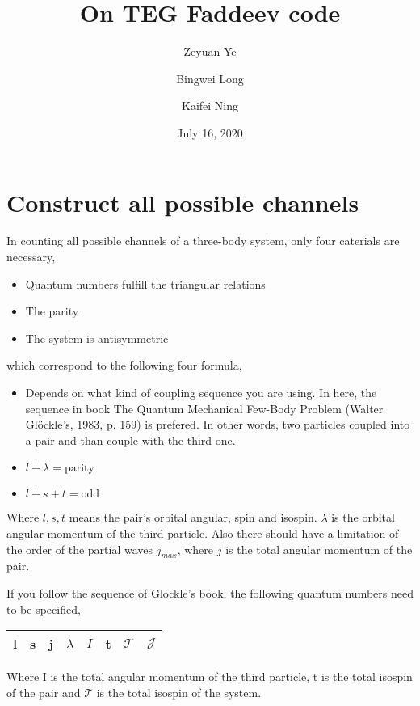 \documentclass[11pt,aps]{revtex4}
\begin{document}
\date{July 16, 2020}

\title{On TEG Faddeev code}

\author{Zeyuan Ye}
\author{Bingwei Long}
\author{Kaifei Ning}

\maketitle

\section{Construct all possible channels}
In counting all possible channels of a three-body system, only four caterials are necessary,

\begin{itemize}
\item{Quantum numbers fulfill the triangular relations}
\item{The parity}
\item{The system is antisymmetric}
\end{itemize}

which correspond to the following four formula,

\begin{itemize}
\item{Depends on what kind of coupling sequence you are using. In here, the
    sequence in book The Quantum Mechanical Few-Body Problem (Walter Glöckle's,
    1983, p. 159) is prefered. In other words, two
    particles coupled into a pair and than couple with the third one.}
\item{$l+\lambda = \text{parity}$}
\item{$l + s + t = \text{odd}$}
\end{itemize}

Where $l, s, t$ means the pair's orbital angular, spin and isospin. $\lambda$ is
the orbital angular momentum of the third particle.
Also there should have a limitation of the order of the partial waves $j_{max}$,
where $j$ is the total angular momentum of the pair.

If you follow the sequence of Glockle's book, the following quantum numbers need
to be specified,
\begin{center}
\begin{tabular}{ | c  c  c c c c c c|}
\hline
l & s & j & $\lambda$ & $I$ & t & $\mathcal{T}$ & $\mathcal{J}$ \\
\hline
\end{tabular}
\end{center}
Where I is the total angular momentum of the third particle, t is the total
isospin of the pair and $\mathcal{T}$ is the total isospin of the system.
\end{document}

